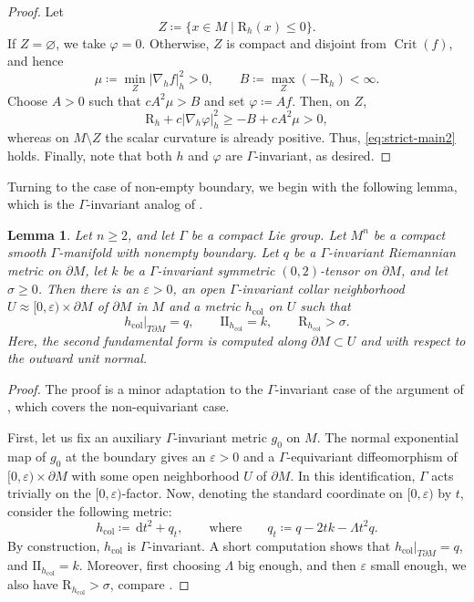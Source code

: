 \documentclass[11pt]{amsart}
\numberwithin{equation}{section}
\newtheorem{lemma}[theorem]{Lemma}
\newcommand{\dd}{\,\mathrm d}
\newcommand{\scal}{\mathrm{R}}
\DeclareMathOperator{\Crit}{Crit}
\let\geq\geqslant
\let\leq\leqslant
\begin{document}
\begin{proof}
Let
\[
    Z\coloneqq \{x\in M\mid\scal_h(x)\leq0\}.
\]
If $Z=\varnothing$, we take $\varphi=0$. Otherwise, $Z$ is compact and
disjoint from $\Crit(f)$, and hence
\[
    \mu\coloneqq \min_Z|\nabla_hf|_h^2>0,
    \qquad
    B\coloneqq \max_Z(-\scal_h)<\infty.
\]
Choose $A>0$ such that $cA^2\mu>B$ and set $\varphi\coloneqq Af$. Then, on $Z$,
\[
    \scal_h+c|\nabla_h\varphi|_h^2
    \geq -B+cA^2\mu>0,
\]
whereas on $M\setminus Z$ the scalar curvature is already positive.
Thus, \eqref{eq:strict-main2} holds. Finally, note that both $h$ and $\varphi$ are
$\Gamma$-invariant, as desired.
\end{proof}

Turning to the case of non-empty boundary, we begin with the following lemma, which is the $\Gamma$-invariant analog of \cite[Remark 3.2]{BaerHankeBoundaryConditions}.

\begin{lemma}
\label{lem:boundary-collar-detailed}
Let $n\geq 2$, and let $\Gamma$ be a compact Lie group. Let $M^n$ be a compact smooth $\Gamma$-manifold with nonempty boundary.
Let $q$ be a $\Gamma$-invariant Riemannian metric on $\partial M$, let
$k$ be a $\Gamma$-invariant symmetric $(0,2)$-tensor on $\partial M$, and let $\sigma\geq 0$.
Then there is an $\varepsilon > 0$, an open $\Gamma$-invariant collar neighborhood $U \approx [0,\varepsilon) \times \partial M$ of $\partial M$ in $M$ and a metric $h_{\mathrm{col}}$ on
$U$ such that
\[
  h_{\mathrm{col}}|_{T\partial M}=q,
  \qquad
  \mathrm{II}_{h_{\mathrm{col}}}=k,
  \qquad
  \scal_{h_{\mathrm{col}}}>\sigma .
\]
Here, the second fundamental form is computed along $\partial M \subset U$ and with respect to the outward unit normal.
\end{lemma}
\begin{proof}
    The proof is a minor adaptation to the $\Gamma$-invariant case of the argument of \cite[Remark 3.2]{BaerHankeBoundaryConditions}, which covers the non-equivariant case. 
    
    First, let us fix an auxiliary $\Gamma$-invariant metric $g_0$ on $M$. 
    The normal exponential map of $g_0$ at the boundary gives an $\varepsilon > 0$ and a  $\Gamma$-equivariant diffeomorphism of $[0,\varepsilon)\times \partial M$ with some open neighborhood $U$ of $\partial M$. 
      In this identification, $\Gamma$ acts trivially on the $[0,\varepsilon)$-factor.
      Now, denoting the standard coordinate on $[0,\varepsilon)$ by $t$, consider the following metric: 
    \begin{equation}\label{eq:collar-metric}
  h_{\mathrm{col}}\coloneqq \dd t^2+q_t,
  \qquad \text{where} \qquad
  q_t\coloneqq q-2t k-\Lambda t^2 q.
\end{equation}
By construction, $h_{\mathrm{col}}$ is $\Gamma$-invariant. 
A short computation shows that $h_{\mathrm{col}}|_{T\partial M}=q$, and $\mathrm{II}_{h_{\mathrm{col}}}=k$. Moreover, first choosing $\Lambda$ big enough, and then $\varepsilon$ small enough, we also have $\scal_{h_{\mathrm{col}}}>\sigma$, compare \cite[Remark 3.2]{BaerHankeBoundaryConditions}.
\end{proof}
\end{document}
